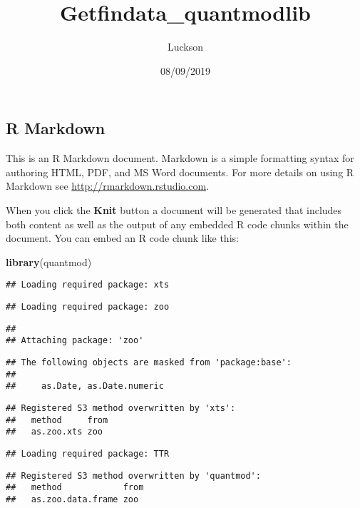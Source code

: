 \documentclass[]{article}
\title{Getfindata\_quantmodlib}
\author{Luckson}
\date{08/09/2019}
\newenvironment{Shaded}{\begin{snugshade}}{\end{snugshade}}
\newcommand{\KeywordTok}[1]{\textcolor[rgb]{0.13,0.29,0.53}{\textbf{#1}}}
\newcommand{\NormalTok}[1]{#1}
\begin{document}
\maketitle

\hypertarget{r-markdown}{%
\subsection{R Markdown}\label{r-markdown}}

This is an R Markdown document. Markdown is a simple formatting syntax
for authoring HTML, PDF, and MS Word documents. For more details on
using R Markdown see \url{http://rmarkdown.rstudio.com}.

When you click the \textbf{Knit} button a document will be generated
that includes both content as well as the output of any embedded R code
chunks within the document. You can embed an R code chunk like this:

\begin{Shaded}
\begin{Highlighting}[]
\KeywordTok{library}\NormalTok{(quantmod)}
\end{Highlighting}
\end{Shaded}

\begin{verbatim}
## Loading required package: xts
\end{verbatim}

\begin{verbatim}
## Loading required package: zoo
\end{verbatim}

\begin{verbatim}
## 
## Attaching package: 'zoo'
\end{verbatim}

\begin{verbatim}
## The following objects are masked from 'package:base':
## 
##     as.Date, as.Date.numeric
\end{verbatim}

\begin{verbatim}
## Registered S3 method overwritten by 'xts':
##   method     from
##   as.zoo.xts zoo
\end{verbatim}

\begin{verbatim}
## Loading required package: TTR
\end{verbatim}

\begin{verbatim}
## Registered S3 method overwritten by 'quantmod':
##   method            from
##   as.zoo.data.frame zoo
\end{verbatim}
\end{document}

